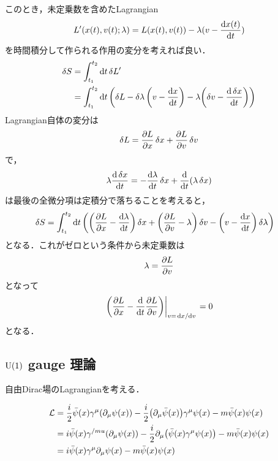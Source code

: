 	このとき，未定乗数を含めたLagrangian
	\begin{align}
			L'(x(t), v(t); \lambda) = L(x(t), v(t)) - \lambda (v - \dv{x(t)}{t})
	\end{align}
	を時間積分して作られる作用の変分を考えれば良い．
	\begin{align}
			\var{S}
			&= \int_{t_1}^{t_2}\dd{t}\var{L'}\\
			&= \int_{t_1}^{t_2}\dd{t}\qty(\var{L} - \var{\lambda}\qty(v - \dv{x}{t}) - \lambda\qty(\var{v} - \dv{\var{x}}{t}))
	\end{align}
	Lagrangian自体の変分は
	\begin{align}
			\var{L} = \pdv{L}{x}\var{x} + \pdv{L}{v}\var{v}
	\end{align}
	で，
	\begin{align}
			\lambda \dv{\var{x}}{t} = -\dv{\lambda}{t}\var{x} + \dv{}{t}\qty(\lambda\var{x})
	\end{align}
	は最後の全微分項は定積分で落ちることを考えると，
	\begin{align}
			\var{S}
			&= \int_{t_1}^{t_2} \dd{t}\qty(\qty(\pdv{L}{x} - \dv{\lambda}{t})\var{x} + \qty(\pdv{L}{v} - \lambda)\var{v} - \qty(v - \dv{x}{t})\var{\lambda})
	\end{align}
	となる．これがゼロという条件から未定乗数は
	\begin{align}
			\lambda = \pdv{L}{v}
	\end{align}
	となって
	\begin{align}
			\eval{\qty(\pdv{L}{x} - \dv{}{t}\pdv{L}{v})}_{v = \dv*{x}{v}} = 0
	\end{align}
	となる．


	\subsection{$\mathrm{U}(1)$ gauge 理論}

	自由Dirac場のLagrangianを考える．

	\begin{align}
			\mathcal{L} &= \frac{i}{2}\bar{\psi}(x) \gamma^{\mu} \qty(\partial_{\mu}\psi(x)) - \frac{i}{2}\qty(\partial_{\mu}\bar{\psi}(x))\gamma^{\mu}\psi(x) - m \bar{\psi}(x)\psi(x)\\
			   &= i \bar{\psi}(x)\gamma^{/mu}\qty(\partial_{\mu}\psi(x)) - \frac{i}{2}\partial_{\mu}\qty(\bar{\psi}(x)\gamma^{\mu}\psi(x)) - m\bar{\psi}(x)\psi(x)\\
			   &= i\bar{\psi}(x)\gamma^{\mu}\partial_{\mu}\psi(x) - m\bar{\psi}(x)\psi(x)
	\end{align}


